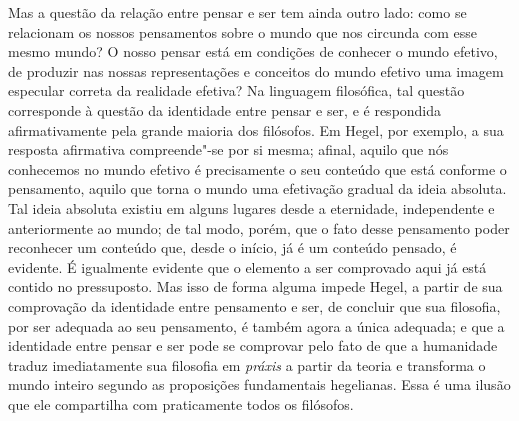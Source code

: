 Mas a questão da relação entre pensar e ser tem ainda outro lado: como
se relacionam os nossos pensamentos sobre o mundo que nos circunda com
esse mesmo mundo? O nosso pensar está em condições de conhecer o mundo
efetivo, de produzir nas nossas representações e conceitos do mundo %
efetivo uma imagem especular correta da realidade 
efetiva? Na linguagem filosófica, tal questão corresponde à questão da %
identidade entre pensar e ser, e é respondida afirmativamente pela
grande maioria dos filósofos.
Em Hegel,
por exemplo, a sua resposta afirmativa compreende"-se por si mesma; %
afinal, aquilo que nós conhecemos no mundo efetivo é precisamente o seu
conteúdo que está conforme o pensamento, aquilo que torna o mundo uma
efetivação gradual da ideia absoluta. Tal ideia absoluta existiu em
alguns lugares desde a eternidade, independente e anteriormente ao
mundo; de tal modo, porém, que o fato desse pensamento poder reconhecer %
um conteúdo que, desde o início, já é um conteúdo pensado, é evidente. É
igualmente evidente que o elemento a ser comprovado aqui já está contido
no pressuposto. Mas isso de forma alguma impede Hegel, a partir de sua
comprovação da identidade entre pensamento e ser, de concluir que sua
filosofia, por ser adequada ao seu pensamento, é também agora a única
adequada; e que a identidade entre pensar e ser pode se comprovar pelo %
fato de que a humanidade traduz imediatamente sua filosofia em
\emph{práxis} a partir da teoria e transforma o mundo inteiro segundo as
proposições fundamentais hegelianas. Essa é uma ilusão que ele
compartilha com praticamente todos os filósofos.

